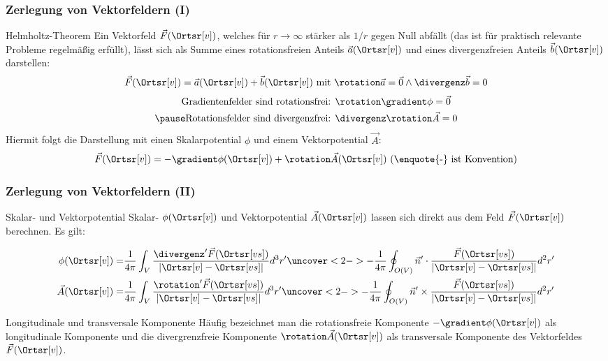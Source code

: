 \begin{frame}
  \frametitle{Zerlegung von Vektorfeldern (I)}
  \begin{block}{Helmholtz-Theorem}
    Ein Vektorfeld $\vec{F}(\Ortsr[v])$, welches für $r\to\infty$
    stärker als $1/r$ gegen Null abfällt (das ist für praktisch
    relevante Probleme regelmäßig erfüllt), lässt sich als Summe eines
    rotationsfreien Anteils $\vec{a}(\Ortsr[v])$ und eines
    divergenzfreien Anteils $\vec{b}(\Ortsr[v])$ darstellen:
    $$
    \vec{F}(\Ortsr[v]) = \vec{a}(\Ortsr[v]) + \vec{b}(\Ortsr[v]) \text{ mit
    } \rotation  \vec{a} = \vec{0} \land \divergenz  \vec{b} = 0 
    $$\pause
    \begin{align*}
    \text{Gradientenfelder sind rotationsfrei: } & \rotation\gradient \phi =\vec{0}\\ \pause
      \text{Rotationsfelder sind divergenzfrei: } & \divergenz\rotation \vec{A}
                                                    = 0
    \end{align*}\pause
    Hiermit folgt die Darstellung mit einen \alert{Skalarpotential}
    $\phi$ und einem \alert{Vektorpotential} $\vec{A}$:
    $$
    \vec{F}(\Ortsr[v]) = - \gradient \phi (\Ortsr[v]) + \rotation
    \vec{A}(\Ortsr[v]) \text{ (\enquote{-} ist Konvention)}
    $$
  \end{block}
  \end{frame}
\begin{frame}
  \frametitle{Zerlegung von Vektorfeldern (II)}
  \begin{block}{Skalar- und Vektorpotential}
    \alert{Skalar-} $\phi (\Ortsr[v])$ und \alert{Vektorpotential}
    $\vec{A}(\Ortsr[v])$ lassen sich direkt aus dem Feld
    $\vec{F}(\Ortsr[v])$ berechnen. Es gilt:

    \begin{align*}
  \phi (\Ortsr[v]) = & \frac{1}{4\pi} \int_V \frac{\divergenz'
                     \vec{F}(\Ortsr[vs])}{\left|\Ortsr[v]-\Ortsr[vs]\right|}
                     d^3r'  \uncover<2->{- \frac{1}{4\pi} \oint_{O(V)}
                     \vec{n}' \cdot \frac{\vec{F}(\Ortsr[vs])}{\left|\Ortsr[v]-\Ortsr[vs]\right|}
                     d^2r'}\\
  \vec{A} (\Ortsr[v]) = & \frac{1}{4\pi} \int_V \frac{\rotation'
                     \vec{F}(\Ortsr[vs])}{\left|\Ortsr[v]-\Ortsr[vs]\right|}
                     d^3r'  \uncover<2->{- \frac{1}{4\pi} \oint_{O(V)}
                     \vec{n}' \times \frac{\vec{F}(\Ortsr[vs])}{\left|\Ortsr[v]-\Ortsr[vs]\right|}
                     d^2r'}
    \end{align*}\pause
  \end{block}\pause

  \begin{block}{Longitudinale und transversale Komponente}
    Häufig bezeichnet man die rotationsfreie Komponente $ - \gradient
    \phi (\Ortsr[v])$ als \alert{longitudinale Komponente} und die
    divergrenzfreie Komponente $\rotation
    \vec{A}(\Ortsr[v])$ als \alert{transversale Komponente} des
    Vektorfeldes $\vec{F}(\Ortsr[v])$.
    \end{block}
  \end{frame}


